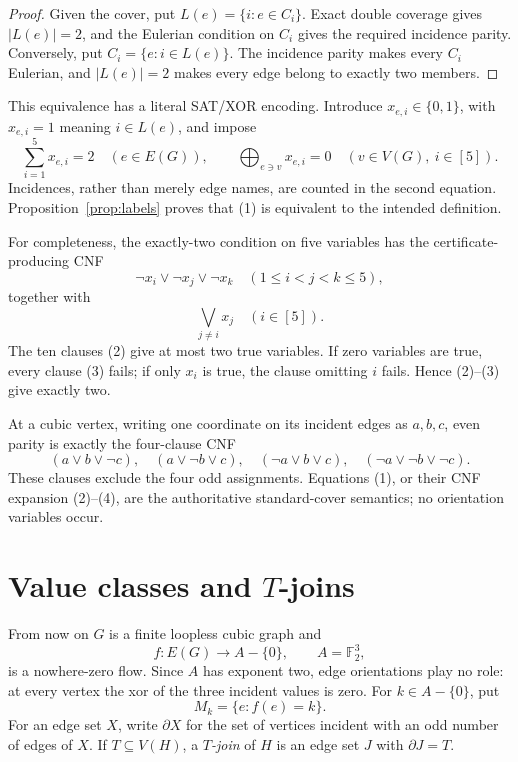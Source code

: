 \documentclass[11pt]{article}
\theoremstyle{definition}
\theoremstyle{remark}
\newcommand{\F}{\mathbb F}
\newcommand{\bd}{\partial}
\begin{document}
\begin{proof}
Given the cover, put \(L(e)=\{i:e\in C_i\}\).  Exact double coverage gives
\(|L(e)|=2\), and the Eulerian condition on \(C_i\) gives the required
incidence parity.  Conversely, put \(C_i=\{e:i\in L(e)\}\).  The incidence
parity makes every \(C_i\) Eulerian, and \(|L(e)|=2\) makes every edge
belong to exactly two members.
\end{proof}

This equivalence has a literal SAT/XOR encoding.  Introduce
\(x_{e,i}\in\{0,1\}\), with \(x_{e,i}=1\) meaning \(i\in L(e)\), and impose
\[
 \sum_{i=1}^5x_{e,i}=2\quad(e\in E(G)),\qquad
 \bigoplus_{e\ni v}x_{e,i}=0\quad(v\in V(G),\ i\in[5]).             \tag{1}
\]
Incidences, rather than merely edge names, are counted in the second
equation.  Proposition~\ref{prop:labels} proves that (1) is equivalent to
the intended definition.

For completeness, the exactly-two condition on five variables has the
certificate-producing CNF
\[
 \neg x_i\vee\neg x_j\vee\neg x_k
 \quad(1\le i<j<k\le5),                            \tag{2}
\]
together with
\[
 \bigvee_{j\ne i}x_j\quad(i\in[5]).                \tag{3}
\]
The ten clauses (2) give at most two true variables.  If zero variables
are true, every clause (3) fails; if only \(x_i\) is true, the clause
omitting \(i\) fails.  Hence (2)--(3) give exactly two.

At a cubic vertex, writing one coordinate on its incident edges as
\(a,b,c\), even parity is exactly the four-clause CNF
\[
 (a\vee b\vee\neg c),\quad(a\vee\neg b\vee c),\quad
 (\neg a\vee b\vee c),\quad(\neg a\vee\neg b\vee\neg c).           \tag{4}
\]
These clauses exclude the four odd assignments.  Equations (1), or their
CNF expansion (2)--(4), are the authoritative standard-cover semantics;
no orientation variables occur.

\section{Value classes and \texorpdfstring{\(T\)}{T}-joins}
\label{sec:value}

From now on \(G\) is a finite loopless cubic graph and
\[
 f:E(G)\longrightarrow A-\{0\},\qquad A=\F_2^3,
\]
is a nowhere-zero flow.  Since \(A\) has exponent two, edge orientations
play no role: at every vertex the xor of the three incident values is
zero.  For \(k\in A-\{0\}\), put
\[
 M_k=\{e:f(e)=k\}.
\]
For an edge set \(X\), write \(\bd X\) for the set of vertices incident
with an odd number of edges of \(X\).  If \(T\subseteq V(H)\), a
\emph{\(T\)-join} of \(H\) is an edge set \(J\) with \(\bd J=T\).
\end{document}

